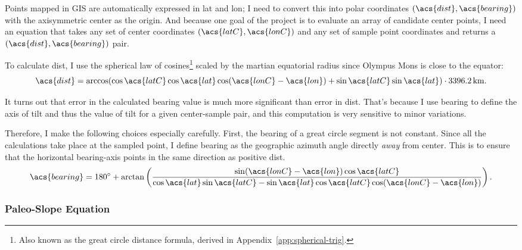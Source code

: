 Points mapped in GIS are automatically expressed in \ac{lat} and \ac{lon}; I need to convert this into polar coordinates $(\acs{dist},\acs{bearing})$ with the axisymmetric center as the origin. And because one goal of the project is to evaluate an array of candidate center points, I need an equation that takes any set of center coordinates $(\acs{latC}, \acs{lonC})$ and any set of sample point coordinates and returns a $(\acs{dist},\acs{bearing})$ pair.

To calculate \acf{dist}, I use the spherical law of cosines\footnote{Also known as the great circle distance formula, derived in Appendix~\ref{app:spherical-trig}.} scaled by the martian equatorial radius since Olympus Mons is close to the equator:
\begin{equation}
    \acs{dist}=\arccos(\cos\acs{latC}\cos\acs{lat}\cos(\acs{lonC}-\acs{lon}) + \sin\acs{latC}\sin\acs{lat})\cdot\qty{3396.2}{\km}.
\end{equation}

It turns out that error in the calculated \acs{bearing} value is much more significant than error in \acs{dist}. That's because I use \acs{bearing} to define the axis of tilt and thus the value of tilt for a given center-sample pair, and this computation is very sensitive to minor variations.

Therefore, I make the following choices especially carefully. First, the bearing of a great circle segment is not constant. Since all the calculations take place at the sampled point, I define \acs{bearing} as the geographic azimuth angle directly \emph{away} from \acs{center}. This is to ensure that the horizontal \acs{bearing}-axis points in the same direction as positive \acs{dist}.
\begin{equation}
    \acs{bearing} = \ang{180} + \arctan\left(\frac{\sin(\acs{lonC}-\acs{lon})\cos\acs{latC}} {\cos\acs{lat} \sin\acs{latC}-\sin\acs{lat}\cos\acs{latC}\cos(\acs{lonC}-\acs{lon})}\right).
\end{equation} 

\subsubsection{Paleo-Slope Equation}\label{sec:paleo-slope}

